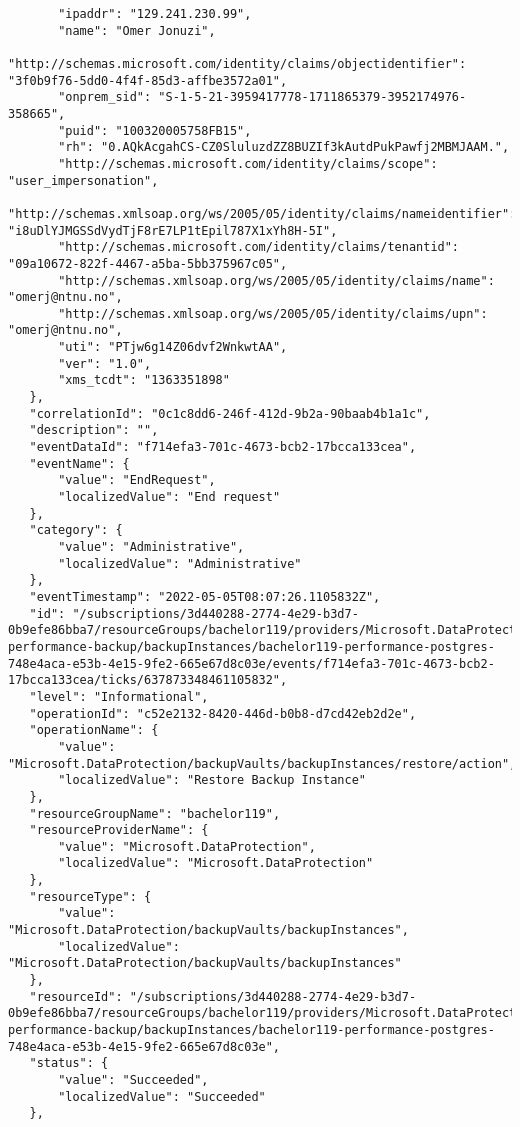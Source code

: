 \begin{verbatim}
       "ipaddr": "129.241.230.99",
       "name": "Omer Jonuzi",
       "http://schemas.microsoft.com/identity/claims/objectidentifier": "3f0b9f76-5dd0-4f4f-85d3-affbe3572a01",
       "onprem_sid": "S-1-5-21-3959417778-1711865379-3952174976-358665",
       "puid": "100320005758FB15",
       "rh": "0.AQkAcgahCS-CZ0SluluzdZZ8BUZIf3kAutdPukPawfj2MBMJAAM.",
       "http://schemas.microsoft.com/identity/claims/scope": "user_impersonation",
       "http://schemas.xmlsoap.org/ws/2005/05/identity/claims/nameidentifier": "i8uDlYJMGSSdVydTjF8rE7LP1tEpil787X1xYh8H-5I",
       "http://schemas.microsoft.com/identity/claims/tenantid": "09a10672-822f-4467-a5ba-5bb375967c05",
       "http://schemas.xmlsoap.org/ws/2005/05/identity/claims/name": "omerj@ntnu.no",
       "http://schemas.xmlsoap.org/ws/2005/05/identity/claims/upn": "omerj@ntnu.no",
       "uti": "PTjw6g14Z06dvf2WnkwtAA",
       "ver": "1.0",
       "xms_tcdt": "1363351898"
   },
   "correlationId": "0c1c8dd6-246f-412d-9b2a-90baab4b1a1c",
   "description": "",
   "eventDataId": "f714efa3-701c-4673-bcb2-17bcca133cea",
   "eventName": {
       "value": "EndRequest",
       "localizedValue": "End request"
   },
   "category": {
       "value": "Administrative",
       "localizedValue": "Administrative"
   },
   "eventTimestamp": "2022-05-05T08:07:26.1105832Z",
   "id": "/subscriptions/3d440288-2774-4e29-b3d7-0b9efe86bba7/resourceGroups/bachelor119/providers/Microsoft.DataProtection/backupVaults/bachelor119-performance-backup/backupInstances/bachelor119-performance-postgres-748e4aca-e53b-4e15-9fe2-665e67d8c03e/events/f714efa3-701c-4673-bcb2-17bcca133cea/ticks/637873348461105832",
   "level": "Informational",
   "operationId": "c52e2132-8420-446d-b0b8-d7cd42eb2d2e",
   "operationName": {
       "value": "Microsoft.DataProtection/backupVaults/backupInstances/restore/action",
       "localizedValue": "Restore Backup Instance"
   },
   "resourceGroupName": "bachelor119",
   "resourceProviderName": {
       "value": "Microsoft.DataProtection",
       "localizedValue": "Microsoft.DataProtection"
   },
   "resourceType": {
       "value": "Microsoft.DataProtection/backupVaults/backupInstances",
       "localizedValue": "Microsoft.DataProtection/backupVaults/backupInstances"
   },
   "resourceId": "/subscriptions/3d440288-2774-4e29-b3d7-0b9efe86bba7/resourceGroups/bachelor119/providers/Microsoft.DataProtection/backupVaults/bachelor119-performance-backup/backupInstances/bachelor119-performance-postgres-748e4aca-e53b-4e15-9fe2-665e67d8c03e",
   "status": {
       "value": "Succeeded",
       "localizedValue": "Succeeded"
   },

\end{verbatim}
